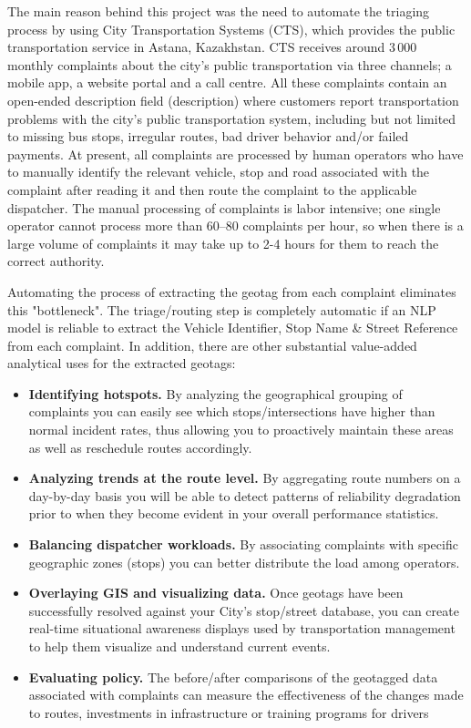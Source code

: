 The main reason behind this project was the need to automate the triaging process by using City Transportation Systems (CTS), which provides the public transportation service in Astana, Kazakhstan. CTS receives around 3\,000 monthly complaints about the city’s public transportation via three channels; a mobile app, a website portal and a call centre. All these complaints contain an open-ended description field (description) where customers report transportation problems with the city's public transportation system, including but not limited to missing bus stops, irregular routes, bad driver behavior and/or failed payments. At present, all complaints are processed by human operators who have to manually identify the relevant vehicle, stop and road associated with the complaint after reading it and then route the complaint to the applicable dispatcher. The manual processing of complaints is labor intensive; one single operator cannot process more than 60--80 complaints per hour, so when there is a large volume of complaints it may take up to 2-4 hours for them to reach the correct authority.

Automating the process of extracting the geotag from each complaint eliminates this "bottleneck". The triage/routing step is completely automatic if an NLP model is reliable to extract the Vehicle Identifier, Stop Name \& Street Reference from each complaint. In addition, there are other substantial value-added analytical uses for the extracted geotags:

\begin{itemize}
  \item \textbf{Identifying hotspots.} By analyzing the geographical grouping of complaints you can easily see which stops/intersections have higher than normal incident rates, thus allowing you to proactively maintain these areas as well as reschedule routes accordingly.
  \item \textbf{Analyzing trends at the route level.} By aggregating route numbers on a day-by-day basis you will be able to detect patterns of reliability degradation prior to when they become evident in your overall performance statistics.
  \item \textbf{Balancing dispatcher workloads.} By associating complaints with specific geographic zones (stops) you can better distribute the load among operators.
  \item \textbf{Overlaying GIS and visualizing data.} Once geotags have been successfully resolved against your City's stop/street database, you can create real-time situational awareness displays used by transportation management to help them visualize and understand current events.
  \item \textbf{Evaluating policy.} The before/after comparisons of the geotagged data associated with complaints can measure the effectiveness of the changes made to routes, investments in infrastructure or training programs for drivers
\end{itemize}

